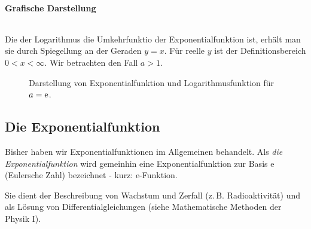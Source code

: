 \newpage
\paragraph{Grafische Darstellung}$~$

Die der Logarithmus die Umkehrfunktio der Exponentialfunktion ist, erhält man sie durch Spiegellung an der Geraden $y=x$. Für reelle $y$ ist der Definitionsbereich $0 < x < \infty$. Wir betrachten den Fall $a > 1$.
\begin{figure}[htp]
    \centering
    \caption{Darstellung von Exponentialfunktion und Logarithmusfunktion für $a = \mathrm{e}$.}
    \label{}
\end{figure}


\subsection{Die Exponentialfunktion}
Bisher haben wir Exponentialfunktionen im Allgemeinen behandelt. Als \emph{die Exponentialfunktion} wird gemeinhin eine Exponentialfunktion zur Basis e (Eulersche Zahl) bezeichnet - kurz: e-Funktion.

Sie dient der Beschreibung von Wachstum und Zerfall (z.\,B. Radioaktivität) und als Lösung von Differentialgleichungen (siehe Mathematische Methoden der Physik I).

